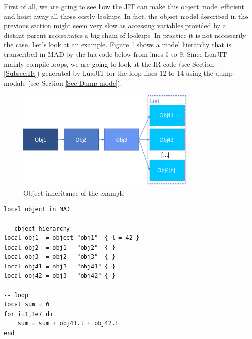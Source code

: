 
First of all, we are going to see how the JIT can make this object model
efficient and hoist away  all those costly lookups. In fact, the object model
described in the previous section might seem very slow as accessing variables
provided by a distant parent necessitates a big chain of lookups. In practice it
is not necessarily the case. Let's look at an example. Figure \ref{fig:MO-ex}
shows a model hierarchy that is transcribed in MAD by the lua code below from
lines 3 to 9. Since LuaJIT mainly compile loops, we are going to look at the IR
code (see Section \ref{Subsec:IR}) generated by LuaJIT for the loop lines 12 to 14
using the dump module (see Section \ref{Sec:Dump-mode}).

\begin{figure}[H]
    \centering
    \includegraphics[width=0.8\textwidth]{./Images/MO-ex.pdf}
    \caption{Object inheritance of the example}
    \label{fig:MO-ex}
\end{figure}

\begin{lstlisting}[style=LuaStyle]
local object in MAD

-- object hierarchy
local obj1  = object "obj1"  { l = 42 }
local obj2  = obj1   "obj2"  { }
local obj3  = obj2   "obj3"  { }
local obj41 = obj3   "obj41" { }
local obj42 = obj3   "obj42" { }

-- loop
local sum = 0
for i=1,1e7 do
	sum = sum + obj41.l + obj42.l
end
\end{lstlisting}

